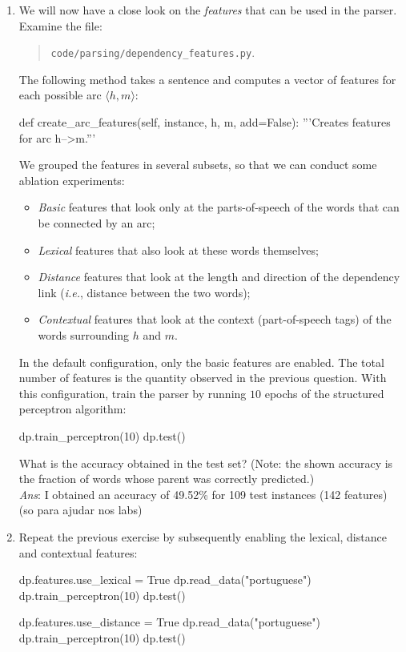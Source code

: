\begin{exercise}
\begin{enumerate}
\item We will now have a close look on the \emph{features} that can be used in the parser. 
Examine the file:
\begin{quote}
{\tt code/parsing/dependency\_features.py}. 
\end{quote}
The following method takes a sentence and computes a vector of features for each possible arc $\langle h, m \rangle$: 
\begin{python}
def create_arc_features(self, instance, h, m, add=False):
	'''Creates features for arc h-->m.'''
\end{python}
We grouped the features in several subsets, so that we can conduct some ablation experiments: 
\begin{itemize}
\item \emph{Basic} features that look only at the parts-of-speech of the words that can be connected by an arc;
\item \emph{Lexical} features that also look at these words themselves;
\item \emph{Distance} features that look at the length and direction of the dependency link (\emph{i.e.}, distance between the two words);
\item \emph{Contextual} features that look at the context (part-of-speech tags) of the words 
surrounding $h$ and $m$. 
\end{itemize}
In the default configuration, only the basic features are enabled. The total number of features 
is the quantity observed in the previous question. 
With this configuration, 
train the parser by running $10$ epochs of the structured perceptron algorithm: 
\begin{python}
dp.train_perceptron(10)
dp.test()
\end{python}
What is the accuracy obtained in the test set? (Note: the shown accuracy is the fraction of words whose parent was correctly predicted.)\\
{\emph{Ans}: I obtained an accuracy of 49.52\% for 109 test instances (142 features) (so para ajudar nos labs)}
\item Repeat the previous exercise by 
subsequently enabling the lexical, distance and contextual features:
\begin{python}
dp.features.use_lexical = True
dp.read_data("portuguese")
dp.train_perceptron(10)
dp.test()

dp.features.use_distance = True
dp.read_data("portuguese")
dp.train_perceptron(10)
dp.test()


\end{python}
\end{enumerate}
\end{exercise}
